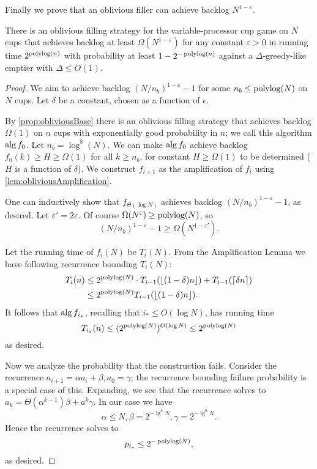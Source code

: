 Finally we prove that an oblivious filler can achieve backlog
$N^{1-\varepsilon}$. 
\begin{theorem}
  There is an oblivious filling strategy for the
  variable-processor cup game on $N$ cups that achieves backlog
  at least $\Omega(N^{1-\varepsilon})$ for any constant $\varepsilon
  >0$ in running time $2^{\operatorname{\text{polylog}}(n)}$ with probability at least
  $1-2^{-\operatorname{\text{polylog}}(n)}$ against a $\Delta$-greedy-like emptier
  with $\Delta \le O(1)$.
\end{theorem}
\begin{proof}
  We aim to achieve backlog $(N/n_b)^{1-\varepsilon}-1$ for some
  $n_b \le \operatorname{\text{polylog}}(N)$ on $N$ cups.
  Let $\delta$ be a constant, chosen as a function of $\epsilon$.

  By \cref{prop:obliviousBase} there is an oblivious filling
  strategy that achieves backlog $\Omega(1)$ on $n$ cups with
  exponentially good probability in $n$; we call this algorithm
  $\operatorname{\text{\textup{alg}}}{f_0}$. Let $n_b = \log^8(N)$. We can make $\operatorname{\text{\textup{alg}}}{f_0}$
  achieve backlog $f_0(k) \ge H \ge \Omega(1)$ for all $k \ge
  n_b$, for constant $H \ge \Omega(1)$ to be determined ($H$ is a
  function of $\delta$). We construct $f_{i+1}$ as the
  amplification of $f_i$ using \cref{lem:obliviousAmplification}.

  One can inductively show that $f_{\Theta(\log N)}$ achieves
  backlog $(N/n_b)^{1-\varepsilon} -1$, as desired. Let
  $\varepsilon' = 2\varepsilon$. Of course $\Omega(N^\varepsilon)
  \ge \operatorname{\text{polylog}}(N)$, so $$(N/n_b)^{1-\varepsilon}-1 \ge
  \Omega(N^{1-\varepsilon'}).$$

  Let the running time of $f_i(N)$ be $T_i(N)$. From the
  Amplification Lemma we have following recurrence bounding $T_i(N)$:
  \begin{align*}
    T_i(n) &\le 2^{\operatorname{\text{polylog}}(N)} \cdot T_{i-1}(\left\lfloor (1-\delta)n \right\rfloor) + T_{i-1}(\left\lceil \delta n \right\rceil) \\
            &\le 2^{\operatorname{\text{polylog}}(N)}T_{i-1}(\left\lfloor (1-\delta)n \right\rfloor).
  \end{align*}
  It follows that $\operatorname{\text{\textup{alg}}}{f_{i_*}}$, recalling that $i_* \le O(\log N)$, has running time
  $$T_{i_*}(n) \le (2^{\operatorname{\text{polylog}}(N)})^{O(\log N)} \le 2^{\operatorname{\text{polylog}}(N)}$$
  as desired.

  Now we analyze the probability that the construction fails. 
  Consider the recurrence $a_{i+1} = \alpha a_i + \beta, a_0 =
  \gamma$; the recurrence bounding failure probability is a
  special case of this. Expanding, we see that the recurrence
  solves to $a_k = \Theta(\alpha^{k-1})\beta + a^k \gamma$.
  In our case we have 
  $$\alpha \le N, \beta = 2^{-\lg^8 N}, \gamma = 2^{-\lg^8 N}.$$
  Hence the recurrence solves to 
  $$p_{i_*} \le 2^{-\operatorname{\text{polylog}}(N)},$$
  as desired.

\end{proof}

